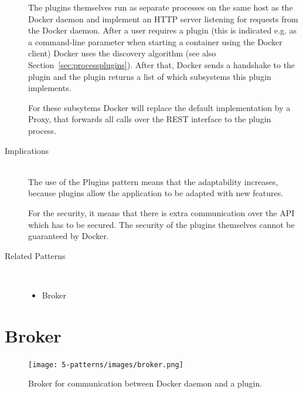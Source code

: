 \begin{description}
The plugins themselves run as separate processes on the same host as the Docker daemon and implement an HTTP server listening for requests from the Docker daemon. After a user requires a plugin (this is indicated e.g. as a command-line parameter when starting a container using the Docker client) Docker uses the discovery algorithm (see also Section~\ref{sec:processplugins}). After that, Docker sends a handshake to the plugin and the plugin returns a list of which subsystems this plugin implements.

For these subsytems Docker will replace the default implementation by a Proxy, that forwards all calls over the REST interface to the plugin process.

\item [Implications]~\\
The use of the Plugins pattern means that the adaptability increases, because plugins allow the application to be adapted with new features.

For the security, it means that there is extra communication over the API which has to be secured. The security of the plugins themselves cannot be guaranteed by Docker.

\item [Related Patterns]~
\begin{itemize}
\item Broker
\end{itemize}
\end{description}

\clearpage
\section{Broker}
\begin{figure}[H]
\centering
\texttt{[image: 5-patterns/images/broker.png]}
\caption{Broker for communication between Docker daemon and a plugin.}
\label{fig:broker-pattern}
\end{figure}

